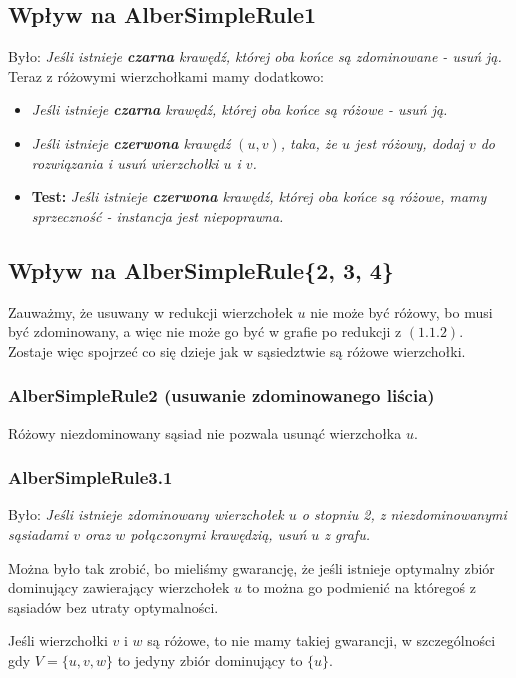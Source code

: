 \documentclass[12pt]{article}
\begin{document}
\subsection{Wpływ na AlberSimpleRule1}
Było: \emph{Jeśli istnieje \textbf{czarna} krawędź, której oba końce są zdominowane - usuń ją.}\\

Teraz z różowymi wierzchołkami mamy dodatkowo:
\begin{itemize}
\item \emph{Jeśli istnieje \textbf{czarna} krawędź, której oba końce są różowe - usuń ją.}\\
\item \emph{Jeśli istnieje \textbf{czerwona} krawędź $(u, v)$, taka, że $u$ jest różowy, dodaj $v$ do rozwiązania i usuń wierzchołki $u$ i $v$.}
\item \textbf{Test:} \emph{Jeśli istnieje \textbf{czerwona} krawędź, której oba końce są różowe, mamy sprzeczność - instancja jest niepoprawna.} 

\end{itemize}


\subsection{Wpływ na AlberSimpleRule\{2, 3, 4\}}
Zauważmy, że usuwany w redukcji wierzchołek $u$ nie może być różowy, bo musi być zdominowany, a więc nie może go być w grafie po redukcji z $(1.1.2)$.
Zostaje więc spojrzeć co się dzieje jak w sąsiedztwie są różowe wierzchołki.

\subsubsection{AlberSimpleRule2 (usuwanie zdominowanego liścia)}
Różowy niezdominowany sąsiad nie pozwala usunąć wierzchołka $u$.

\subsubsection{AlberSimpleRule3.1}
Było: \emph{Jeśli istnieje zdominowany wierzchołek $u$ o stopniu 2, z niezdominowanymi sąsiadami $v$ oraz $w$ połączonymi krawędzią, usuń $u$ z grafu. }

Można było tak zrobić, bo mieliśmy gwarancję, że jeśli istnieje optymalny zbiór dominujący zawierający wierzchołek $u$ to można go podmienić na któregoś z sąsiadów bez utraty optymalności. 

Jeśli wierzchołki $v$ i $w$ są różowe, to nie mamy takiej gwarancji, w szczególności gdy $V = \{u, v, w\}$ to jedyny zbiór dominujący to $\{u\}$.
\end{document}
